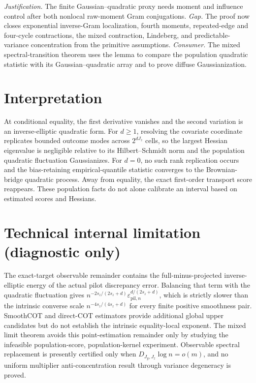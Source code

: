 \documentclass{article}
\begin{document}
\par\smallskip\noindent \textit{Justification.} The finite Gaussian--quadratic proxy needs moment and influence control after both nonlocal raw-moment Gram conjugations. \textit{Gap.} The proof now closes exponential inverse-Gram localization, fourth moments, repeated-edge and four-cycle contractions, the mixed contraction, Lindeberg, and predictable-variance concentration from the primitive assumptions. \textit{Consumer.} The mixed spectral-transition theorem uses the lemma to compare the population quadratic statistic with its Gaussian--quadratic array and to prove diffuse Gaussianization.

\section{Interpretation}

At conditional equality, the first derivative vanishes and the second variation is an inverse-elliptic quadratic form. For \(d\ge1\), resolving the covariate coordinate replicates bounded outcome modes across \(2^{dJ_z}\) cells, so the largest Hessian eigenvalue is negligible relative to its Hilbert--Schmidt norm and the population quadratic fluctuation Gaussianizes. For \(d=0\), no such rank replication occurs and the bias-retaining empirical-quantile statistic converges to the Brownian-bridge quadratic process. Away from equality, the exact first-order transport score reappears. These population facts do not alone calibrate an interval based on estimated scores and Hessians.

\section*{Technical internal limitation (diagnostic only)}

The exact-target observable remainder contains the full-minus-projected inverse-elliptic energy of the actual pilot discrepancy error. Balancing that term with the quadratic fluctuation gives \(n^{-2s_z/(2s_z+d)}\varepsilon_{\mathrm{pil},n}^{d/(2s_z+d)}\), which is strictly slower than the intrinsic converse scale \(n^{-4s_z/(4s_z+d)}\) for every finite positive smoothness pair. SmoothCOT and direct-COT estimators provide additional global upper candidates but do not establish the intrinsic equality-local exponent. The mixed limit theorem avoids this point-estimation remainder only by studying the infeasible population-score, population-kernel experiment. Observable spectral replacement is presently certified only when \(D_{J_y,J_z}\log n=o(m)\), and no uniform multiplier anti-concentration result through variance degeneracy is proved.
\end{document}
